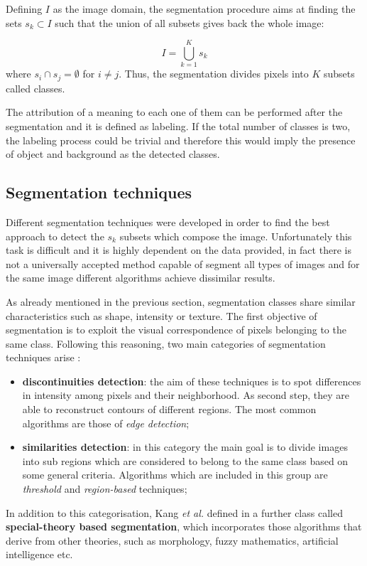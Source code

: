 \documentclass[../main.tex]{subfiles}
\begin{document}
Defining $I$ as the image domain, the segmentation procedure aims at finding the sets $s_{k}\subset I$ such that the union of all subsets gives back the whole image:

\begin{equation}
    I = \bigcup_{k=1}^{K} s_{k}
\end{equation}
where $s_{i}\cap s_{j}=\emptyset$  for $i \not = j$. Thus, the segmentation divides pixels into $K$ subsets called classes.

The attribution of a meaning to each one of them can be performed after the segmentation and it is defined as labeling. If the total number of classes is two, the labeling process could be trivial and therefore this would imply the presence of object and background as the detected classes.   


\subsection{Segmentation techniques}

Different segmentation techniques were developed in order to find the best approach to detect the $s_{k}$ subsets which compose the image. Unfortunately this task is difficult and it is highly dependent on the data provided, in fact there is not a universally accepted method capable of segment all types of images and for the same image different algorithms achieve dissimilar results.

As already mentioned in the previous section, segmentation classes share similar characteristics such as shape, intensity or texture. The first objective of segmentation is to exploit the visual correspondence of pixels belonging to the same class. Following this reasoning, two main categories of segmentation techniques arise \cite{segmentation_review_1}:

\begin{itemize}
    \item \textbf{discontinuities detection}: the aim of these techniques is to spot differences in intensity among pixels and their neighborhood. As second step, they are able to reconstruct contours of different regions. The most common algorithms are those of
    \textit{edge detection};
    \item \textbf{similarities detection}: in this category the main goal is to divide images into sub regions which are considered to belong to the same class based on some general criteria. Algorithms which are included in this group are \textit{threshold} and \textit{region-based} techniques;
\end{itemize}
In addition to this categorisation, Kang \textit{et al.} defined in \cite{kang2009comparative} a further class called \textbf{special-theory based segmentation}, which incorporates those algorithms that derive from other theories, such as  morphology, fuzzy mathematics, artificial intelligence etc.
\end{document}
